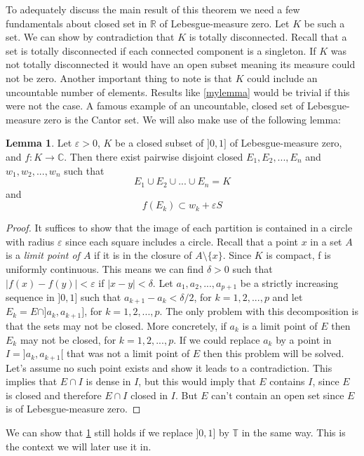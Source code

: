\documentclass[a4paper,12pt,twoside,BCOR=10mm]{scrbook}
\theoremstyle{definition}
\theoremstyle{definition}
\newtheorem{lemma}[theorem]{Lemma}
\theoremstyle{definition}
\begin{document}
To adequately discuss the main result of this theorem we need a few fundamentals about closed set in $\mathbb{R}$ of Lebesgue-measure zero.
Let $K$ be such a set.
We can show by contradiction that $K$ is totally disconnected.
Recall that a set is totally disconnected if each connected component is a singleton.
If $K$ was not totally disconnected it would have an open subset meaning its measure could not be zero.
Another important thing to note is that $K$ could include an uncountable number of elements.
Results like \ref{mylemma} would be trivial if this were not the case.
A famous example of an uncountable, closed set of Lebesgue-measure zero is the Cantor set.
We will also make use of the following lemma:
\begin{lemma}
\label{somelemma}
Let
	$\varepsilon > 0$,
	$K$ be a closed subset of $]0, 1]$ of Lebesgue-measure zero,
	and $f: K \rightarrow \mathbb{C}$.
Then there exist pairwise disjoint closed $E_1, E_2, ..., E_n$ and $w_1, w_2, ..., w_n$ such that 
\[
	E_1 \cup E_2 \cup ... \cup E_n = K
\]
and
\[
	f(E_k) \subset w_k + \varepsilon S \tag*{$k = 1, 2, ..., n$.}
\]
\end{lemma}
\begin{proof}
It suffices to show that the image of each partition is contained in a circle with radius $\varepsilon$ since each square includes a circle.
Recall that a point $x$ in a set $A$ is a \emph{limit point of $A$} if it is in the closure of $A \setminus \{x\}$.
Since $K$ is compact, f is uniformly continuous.
This means we can find $\delta > 0$ such that $|f(x) - f(y)| < \varepsilon$ if $|x - y| < \delta$.
Let $a_1, a_2, ..., a_{p + 1}$ be a strictly increasing sequence in $]0, 1]$ such that $a_{k + 1} - a_k < \delta/2$, for $k = 1, 2, ..., p$ and let $E_k = E \cap ]a_k, a_{k + 1}]$, for $k = 1, 2, ..., p$.
The only problem with this decomposition is that the sets may not be closed.
More concretely, if $a_k$ is a limit point of $E$ then $E_k$ may not be closed, for $k = 1, 2, ..., p$.
If we could replace $a_k$ by a point in $I = ]a_k, a_{k + 1}[$ that was not a limit point of $E$ then this problem will be solved.
Let's assume no such point exists and show it leads to a contradiction.
This implies that $E \cap I$ is dense in $I$, but this would imply that $E$ contains $I$, since $E$ is closed and therefore $E \cap I$ closed in $I$.
But $E$ can't contain an open set since $E$ is of Lebesgue-measure zero.
\end{proof}
We can show that \ref{somelemma} still holds if we replace $]0, 1]$ by $\mathbb{T}$ in the same way.
This is the context we will later use it in.
\end{document}
